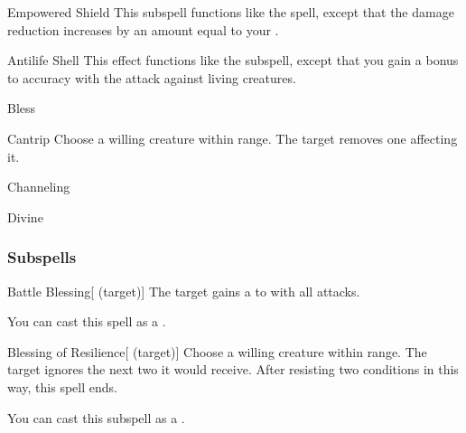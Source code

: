 \begin{ability}[\nth{4}]{Empowered Shield}
This subspell functions like the  spell, except that the damage reduction increases by an amount equal to your .
\end{ability}
\vspace{0.25em}


\begin{ability}[\nth{5}]{Antilife Shell}
This effect functions like the  subspell, except that you gain a  bonus to accuracy with the attack against living creatures.
\end{ability}
\vspace{0.25em}

\newpage
\begin{spellsection}{Bless}

\begin{spellheader}
\end{spellheader}


\begin{ability}{Cantrip}
Choose a willing creature within \rngclose range.
The target removes one  affecting it.
\end{ability}




 Channeling

 Divine
\end{spellsection}


\subsubsection{Subspells}


\begin{ability}[\nth{1}]{Battle Blessing}[ (target)]
The target gains a   to  with all attacks.

You can cast this spell as a .
\end{ability}
\vspace{0.25em}


\begin{ability}[\nth{1}]{Blessing of Resilience}[ (target)]
Choose a willing creature within \rngclose range.
The target ignores the next two  it would receive.
After resisting two conditions in this way, this spell ends.

You can cast this subspell as a .
\end{ability}
\vspace{0.25em}


